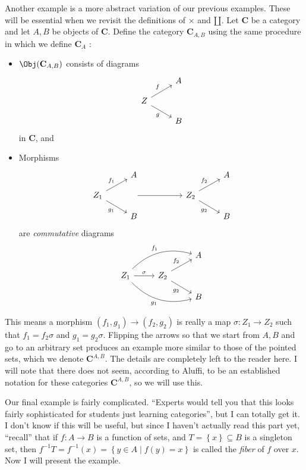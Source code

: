 Another example is a more abstract variation of our previous examples. These will be essential when we revisit the definitions of $\times $ and $\amalg $. Let $\mathbf{C}$ be a category and let $A,B$ be objects of $\mathbf{C}$. Define the category $\mathbf{C}_{A,B}$ using the same procedure in which we define $\mathbf{C}_{A}$ :
\begin{itemize}
	\item $\Obj( \mathbf{C}_{A,B} ) $ consists of diagrams
		\[\begin{tikzcd}[row sep=1em, column sep=2.5em]
			&A\\
			Z\arrow[ru,"f"]\arrow[dr,"g"']\\
			&B
		\end{tikzcd}\]
		in $\mathbf{C}$, and
	\item Morphisms
		\[\begin{tikzcd}[row sep=1em, column sep=2.5em]
			&A&&&A\\
			Z_1\arrow[ru,"f_1"]\arrow[dr,"g_1"']&\arrow[rr]&&Z_2\arrow[ru,"f_2"]\arrow[dr,"g_2"']\\
						      &B&&&B
		\end{tikzcd}\]
		are \emph{commutative} diagrams
		\[\begin{tikzcd}[row sep=1em, column sep=2.5em]
			&&A\\
			Z_1 \arrow[urr, bend left,  "f_1"]\arrow[drr, bend right, "g_1"']\arrow[r,"\sigma "]&Z_2\arrow[ur,"f_2"]\arrow[dr,"g_2"']\\
													    &&B
		\end{tikzcd}\]
		
\end{itemize}
This means a morphism $(f_1,g_1) \to (f_2,g_2)$ is really a map $\sigma : Z_1 \to Z_2$ such that $f_1=f_2\sigma $ and $g_1=g_2\sigma $. Flipping the arrows so that we start from $A,B$ and go to an arbitrary set produces an example more similar to those of the pointed sets, which we denote $\mathbf{C}^{A,B}$. The details are completely left to the reader here. I will note that there does not seem, according to Aluffi, to be an established notation for these categories $\mathbf{C}^{A,B}$, so we will use this.

Our final example is fairly complicated. ``Experts would tell you that this looks fairly sophisticated for students just learning categories'', but I can totally get it. I don't know if this will be useful, but since I haven't actually read this part yet, ``recall'' that if $f: A \to B$ is a function of sets, and $T=\left\{ x \right\} \subseteq B$ is a singleton set, then $f^{-1}T=f^{-1}(x)=\left\{ y\in A \mid f(y)=x \right\} $ is called the \emph{fiber} of $f$ over $x$. Now I will present the example.


